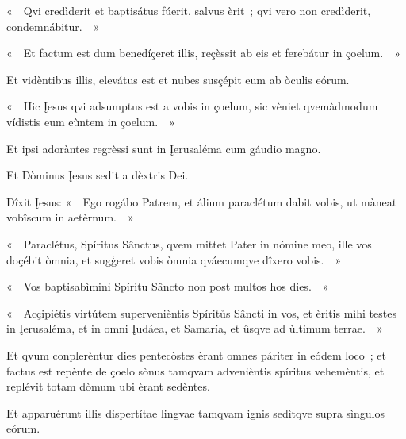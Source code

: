 «~~Qvi credìderit et baptisátus fúerit, salvus èrit~; qvi vero non credìderit, condemnábitur.~~» 

«~~Et factum est dum benedíçeret illis, reçèssit ab eis et ferebátur in çoelum.~~» 

Et vidèntibus illis, elevátus est et nubes susçépit eum ab òculis eórum. 

«~~Hic Įesus qvi adsumptus est a vobis in çoelum, sic vèniet qvemàdmodum vídistis eum eùntem in çoelum.~~» 

Et ipsi adoràntes regrèssi sunt in Įerusaléma cum gáudio magno. 

Et Dòminus Įesus sedit a dèxtris Dei. 


Dîxit Įesus: «~~Ego rogábo Patrem, et álium paraclétum dabit vobis, ut màneat vobîscum in aetèrnum.~~» 

«~~Paraclétus, Spíritus Sânctus, qvem mittet Pater in nómine meo, ille vos doçébit òmnia, et sugģeret vobis òmnia qváecumqve dîxero vobis.~~» 

«~~Vos baptisabìmini Spíritu Sâncto non post multos hos dies.~~» 

«~~Acçipiétis virtútem supervenièntis Spíritůs Sâncti in vos, et èritis mìhi testes in Įerusaléma, et in omni Įudáea, et Samaría, et ûsqve ad ùltimum terrae.~~» 

Et qvum conplerèntur dies pentecòstes èrant omnes páriter in eódem loco~; et factus est repènte de çoelo sònus tamqvam advenièntis spíritus vehemèntis, et replévit totam dòmum ubi èrant sedèntes. 

Et apparuérunt illis dispertítae lingvae tamqvam ignis sedìtqve supra sìngulos eórum. 

